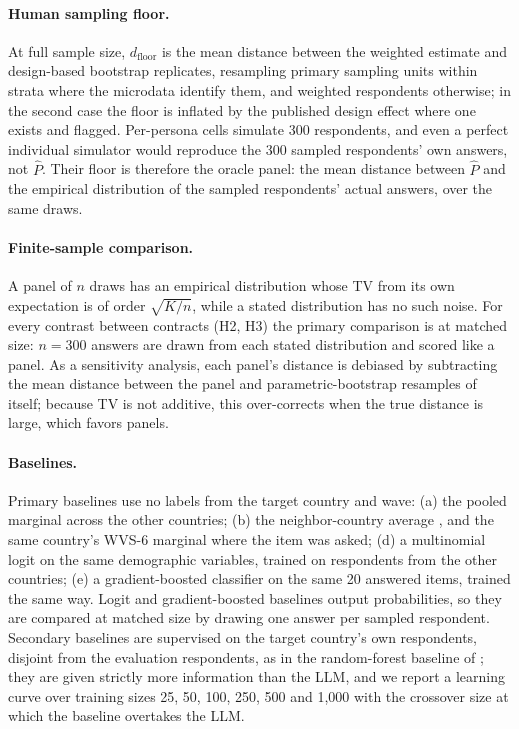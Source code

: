 \documentclass[11pt]{article}
\begin{document}
\paragraph{Human sampling floor.} At full sample size, $d_{\text{floor}}$ is the mean distance between the weighted estimate and design-based bootstrap replicates, resampling primary sampling units within strata where the microdata identify them, and weighted respondents otherwise; in the second case the floor is inflated by the published design effect where one exists and flagged. Per-persona cells simulate 300 respondents, and even a perfect individual simulator would reproduce the 300 sampled respondents' own answers, not $\hat P$. Their floor is therefore the oracle panel: the mean distance between $\hat P$ and the empirical distribution of the sampled respondents' actual answers, over the same draws.

\paragraph{Finite-sample comparison.} A panel of $n$ draws has an empirical distribution whose TV from its own expectation is of order $\sqrt{K/n}$, while a stated distribution has no such noise. For every contrast between contracts (H2, H3) the primary comparison is at matched size: $n = 300$ answers are drawn from each stated distribution and scored like a panel. As a sensitivity analysis, each panel's distance is debiased by subtracting the mean distance between the panel and parametric-bootstrap resamples of itself; because TV is not additive, this over-corrects when the true distance is large, which favors panels.

\paragraph{Baselines.} Primary baselines use no labels from the target country and wave: (a) the pooled marginal across the other countries; (b) the neighbor-country average \citep{wang2026ess}, and the same country's WVS-6 marginal where the item was asked; (d) a multinomial logit on the same demographic variables, trained on respondents from the other countries; (e) a gradient-boosted classifier on the same 20 answered items, trained the same way. Logit and gradient-boosted baselines output probabilities, so they are compared at matched size by drawing one answer per sampled respondent. Secondary baselines are supervised on the target country's own respondents, disjoint from the evaluation respondents, as in the random-forest baseline of \citet{ku2026}; they are given strictly more information than the LLM, and we report a learning curve over training sizes 25, 50, 100, 250, 500 and 1,000 with the crossover size at which the baseline overtakes the LLM.
\end{document}
